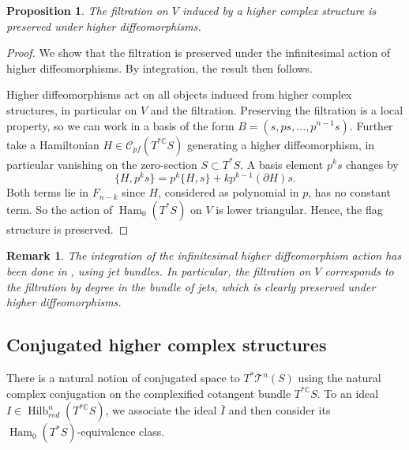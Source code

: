 \documentclass[11pt]{amsart}
\newtheorem{prop}[thm]{Proposition}
\newtheorem{Remark}[thm]{Remark}
\numberwithin{thm}{section} %
\numberwithin{equation}{section} %
\numberwithin{figure}{section} %
\newcommand*{\C}{\mathbb{C}}
\renewcommand*{\S}{S}
\newcommand*{\mc}{\mathcal}
\newcommand*{\del}{\partial}
\newcommand*{\cotang}{T^*\mc{T}^n(S)}
\DeclareMathOperator{\Hilb}{Hilb}
\DeclareMathOperator{\Ham}{Ham}
\begin{document}
\begin{prop}
The filtration on $V$ induced by a higher complex structure is preserved under higher diffeomorphisms.
\end{prop}
\begin{proof}
We show that the filtration is preserved under the infinitesimal action of higher diffeomorphisms. By integration, the result then follows.

Higher diffeomorphisms act on all objects induced from higher complex structures, in particular on $V$ and the filtration.
Preserving the filtration is a local property, so we can work in a basis of the form $B=(s,ps,...,p^{n-1}s)$. Further take a Hamiltonian $H\in \mathcal{C}_{pf}(T^{*\C}\S)$ generating a higher diffeomorphism, in particular vanishing on the zero-section $\S\subset T^*\S$. A basis element $p^ks$ changes by $$\{H, p^ks\}=p^k\{H,s\}+kp^{k-1}(\del H)s.$$ Both terms lie in $F_{n-k}$ since $H$, considered as polynomial in $p$, has no constant term. So the action of $\Ham_0(T^*S)$ on $V$ is lower triangular. Hence, the flag structure is preserved. 
\end{proof}

\begin{Remark}
The integration of the infinitesimal higher diffeomorphism action has been done in \cite{Nolte}, using jet bundles. In particular, the filtration on $V$ corresponds to the filtration by degree in the bundle of jets, which is clearly preserved under higher diffeomorphisms.
\end{Remark}




\subsection{Conjugated higher complex structures}\label{dualcomplexstructure}

There is a natural notion of conjugated space to $\cotang$ using the natural complex conjugation on the complexified cotangent bundle $T^{*\C}S$. To an ideal $I\in \Hilb^n_{red}(T^{*\C}S)$, we associate the ideal $\bar{I}$ and then consider its $\Ham_0(T^*S)$-equivalence class.
\end{document}
